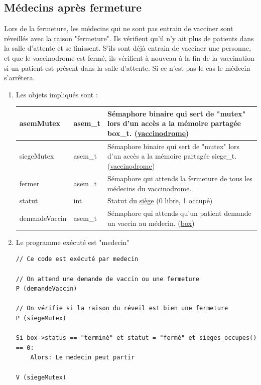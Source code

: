 \documentclass[a4paper]{article}
\begin{document}
  \subsection{Médecins après fermeture}

  Lors de la fermeture, les médecins qui ne sont pas entrain de vacciner sont réveillés avec la raison "fermeture". Ils vérifient qu'il n'y ait plus de patients dans la salle d'attente et se finissent.
  S'ils sont déjà entrain de vacciner une personne, et que le vaccinodrome est fermé, ils vérifient à nouveau à la fin de la vaccination si un patient est présent dans la salle d'attente. Si ce n'est pas le cas le médecin s'arrêtera.

  \begin{enumerate}
    \item Les objets impliqués sont :

    \begin{tabularx}{\linewidth}{|l|l|>{\strut}X|}
      \hline%
      asemMutex & asem\_t & Sémaphore binaire qui sert de "mutex" lors d'un accès a la mémoire partagée box\_t. (\underline{vaccinodrome}) \\ \hline%
      siegeMutex & asem\_t & Sémaphore binaire qui sert de "mutex" lors d'un accès a la mémoire partagée siege\_t. (\underline{vaccinodrome}) \\ \hline%
      fermer & asem\_t & Sémaphore qui attends la fermeture de tous les médecins du \underline{vaccinodrome}. \\ \hline%
      statut & int & Statut du \underline{siège} (0 libre, 1 occupé) \\ \hline%
      demandeVaccin & asem\_t & Sémaphore qui attends qu'un patient demande un vaccin au médecin. (\underline{box}) \\ \hline%
    \end{tabularx}

    \item Le programme exécuté est "medecin"

    \begin{verbatim}
// Ce code est exécuté par medecin

// On attend une demande de vaccin ou une fermeture
P (demandeVaccin)

// On vérifie si la raison du réveil est bien une fermeture
P (siegeMutex)

Si box->status == "terminé" et statut = "fermé" et sieges_occupes() == 0:
    Alors: Le medecin peut partir

V (siegeMutex)


\end{verbatim}
\end{enumerate}
\end{document}
